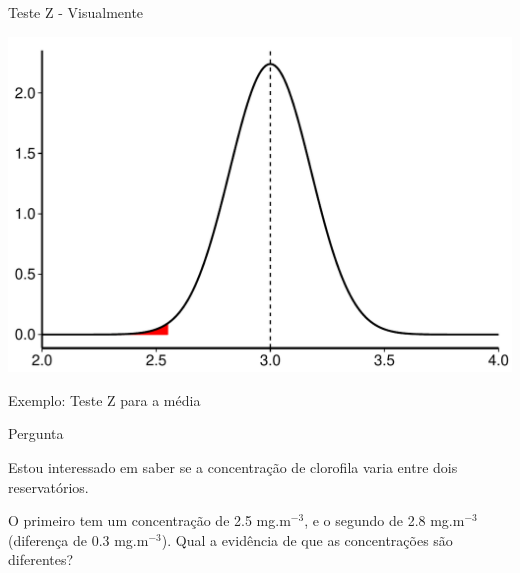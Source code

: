 \documentclass{beamer}\usepackage[]{graphicx}\usepackage[]{color}
\makeatletter
\def\maxwidth{ %
  \ifdim\Gin@nat@width>\linewidth
    \linewidth
  \else
    \Gin@nat@width
  \fi
}
\newenvironment{knitrout}{}{} %
\renewenvironment{knitrout}{\setlength{\topsep}{0mm}}{}
\makeatother
\begin{document}
\begin{frame}[fragile]{Teste Z -  Visualmente}

\begin{knitrout}
\color{fgcolor}
\includegraphics[width=\maxwidth,height=0.7\textheight]{figure/testez21-1} 

\end{knitrout}

\end{frame} 

\begin{frame}{Exemplo: Teste Z para a média}

\begin{block}{Pergunta}

Estou interessado em saber se a concentração de clorofila varia entre dois reservatórios. 

O primeiro  tem um concentração de 2.5 mg.m$^{-3}$, e o segundo de 2.8 mg.m$^{-3}$ (diferença de 0.3 mg.m$^{-3}$). Qual a evidência de que as concentrações são diferentes? 

\end{block}

\end{frame} 
\end{document}
